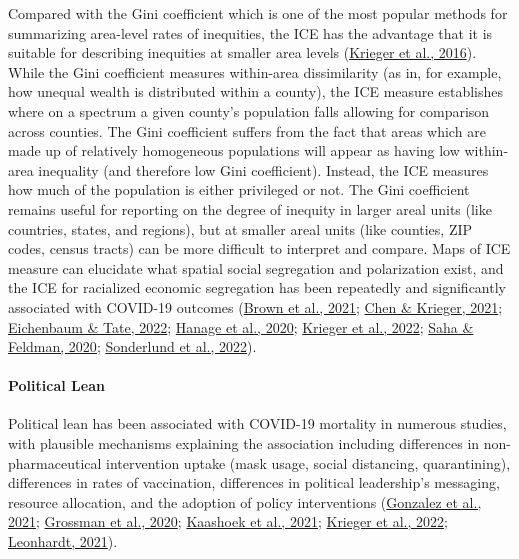 \documentclass[
]{article}
\begin{document}
Compared with the Gini
coefficient which is one of the most popular methods for summarizing area-level
rates of inequities, the ICE has the advantage that it is suitable for
describing inequities at smaller area levels (\protect\hyperlink{ref-krieger_public_2016}{Krieger et al., 2016}). While the
Gini coefficient measures within-area dissimilarity (as in, for example, how
unequal wealth is distributed within a county), the ICE measure establishes
where on a spectrum a given county's population falls allowing for comparison
across counties. The Gini coefficient suffers from the fact that areas which are
made up of relatively homogeneous populations will appear as having low
within-area inequality (and therefore low Gini coefficient). Instead, the ICE
measures how much of the population is either privileged or not. The Gini
coefficient remains useful for reporting on the degree of inequity in larger
areal units (like countries, states, and regions), but at smaller areal units
(like counties, ZIP codes, census tracts) can be more difficult to interpret and
compare. Maps of ICE measure can elucidate what spatial social segregation and
polarization exist, and the ICE for racialized economic segregation has been
repeatedly and significantly associated with COVID-19 outcomes
(\protect\hyperlink{ref-brown_ecological_2021}{Brown et al., 2021}; \protect\hyperlink{ref-chen_revealing_2021}{Chen \& Krieger, 2021}; \protect\hyperlink{ref-eichenbaum_health_2022}{Eichenbaum \& Tate, 2022}; \protect\hyperlink{ref-hanage_covid-19_2020}{Hanage et al., 2020}; \protect\hyperlink{ref-krieger_relationship_2022}{Krieger et al., 2022}; \protect\hyperlink{ref-saha_neighborhood-level_2020}{Saha \& Feldman, 2020}; \protect\hyperlink{ref-sonderlund_racialized_2022}{Sonderlund et al., 2022}).

\hypertarget{political-lean}{%
\paragraph{Political Lean}\label{political-lean}}

Political lean has been associated with COVID-19 mortality in numerous studies,
with plausible mechanisms explaining the association including differences in
non-pharmaceutical intervention uptake (mask usage, social distancing,
quarantining), differences in rates of vaccination, differences in political
leadership's messaging, resource allocation, and the adoption of policy
interventions (\protect\hyperlink{ref-gonzalez_conservatism_2021}{Gonzalez et al., 2021}; \protect\hyperlink{ref-grossman_political_2020}{Grossman et al., 2020}; \protect\hyperlink{ref-kaashoek_evolving_2021}{Kaashoek et al., 2021}; \protect\hyperlink{ref-krieger_relationship_2022}{Krieger et al., 2022}; \protect\hyperlink{ref-leonhardt_red_2021}{Leonhardt, 2021}).
\end{document}
